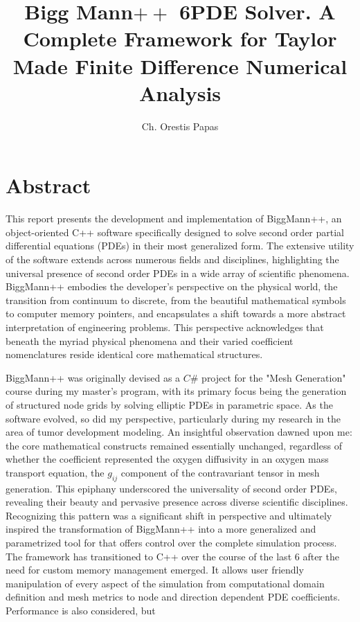 \documentclass{article}
\title{Bigg Mann$++$ 6PDE Solver. A Complete Framework for Taylor Made Finite Difference Numerical Analysis}
\author{Ch. Orestis Papas}
\begin{document}
	\maketitle
	
	\section{Abstract}
	This report presents the development and implementation of BiggMann++, an object-oriented C++ software specifically designed to solve second order partial differential equations (PDEs) in their most generalized form. The extensive utility of the software extends across numerous fields and disciplines, highlighting the universal presence of second order PDEs in a wide array of scientific phenomena. BiggMann++ embodies the developer's perspective on the physical world, the transition from continuum to discrete, from the beautiful mathematical symbols to computer memory pointers, and encapsulates a shift towards a more abstract interpretation of engineering problems. This perspective acknowledges that beneath the myriad physical phenomena and their varied coefficient nomenclatures reside identical core mathematical structures.
	
	BiggMann++ was originally devised as a $C\#$ project for the "Mesh Generation" course during my master's program, with its primary focus being the generation of structured node grids by solving elliptic PDEs in parametric space. As the software evolved, so did my perspective, particularly during my research in the area of tumor development modeling. An insightful observation dawned upon me: the core mathematical constructs remained essentially unchanged, regardless of whether the coefficient represented the oxygen diffusivity in an oxygen mass transport equation, the $g_{ij}$ component of the contravariant tensor in mesh generation. This epiphany underscored the universality of second order PDEs, revealing their beauty and pervasive presence across diverse scientific disciplines. Recognizing this pattern was a significant shift in perspective and ultimately inspired the transformation of BiggMann++ into a more generalized and parametrized tool for that offers control over the complete simulation process. The framework has transitioned to C++ over the course of the last 6 after the need for custom memory management emerged. It allows user friendly manipulation of every aspect of the simulation from computational domain definition and mesh metrics to node and direction dependent PDE coefficients. Performance is also considered, but 
	
\end{document}
